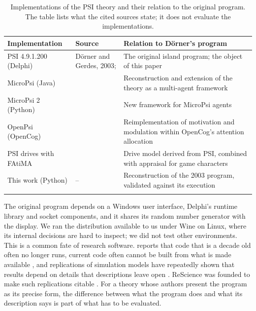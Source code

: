 \documentclass[preprint,12pt,authoryear]{elsarticle}
\begin{document}
\begin{table}[t]
\centering
\caption{Implementations of the PSI theory and their relation to the original program. The table lists what the cited sources state; it does not evaluate the implementations.}
\label{tab:implementations}
\small
\begin{tabularx}{\textwidth}{L{0.21\textwidth} L{0.2\textwidth} Y}
\toprule
Implementation & Source & Relation to D\"orner's program \\
\midrule
PSI 4.9.1.200 (Delphi) & D\"orner and Gerdes, 2003; \citet{doerner2002mechanik} & The original island program; the object of this paper \\ \addlinespace
MicroPsi (Java) & \citet{bach2005studying,bach2009principles} & Reconstruction and extension of the theory as a multi-agent framework \\ \addlinespace
MicroPsi 2 (Python) & \citet{bach2012micropsi2} & New framework for MicroPsi agents \\ \addlinespace
OpenPsi (OpenCog) & \citet{cai2011openpsi} & Reimplementation of motivation and modulation within OpenCog's attention allocation \\ \addlinespace
PSI drives with FAtiMA & \citet{lim2012npcs} & Drive model derived from PSI, combined with appraisal for game characters \\ \addlinespace
This work (Python) & -- & Reconstruction of the 2003 program, validated against its execution \\ \addlinespace
\bottomrule
\end{tabularx}
\end{table}

The original program depends on a Windows user interface, Delphi's runtime library and socket components, and it shares its random number generator with the display. We ran the distribution available to us under Wine on Linux, where its internal decisions are hard to inspect; we did not test other environments. This is a common fate of research software. \citet{perkel2020challenge} reports that code that is a decade old often no longer runs, current code often cannot be built from what is made available \citep{collberg2016repeatability}, and replications of simulation models have repeatedly shown that results depend on details that descriptions leave open \citep{axtell1996aligning,edmonds2003replication,wilensky2007making}. ReScience was founded to make such replications citable \citep{rougier2017rescience}. For a theory whose authors present the program as its precise form, the difference between what the program does and what its description says is part of what has to be evaluated.
\end{document}
